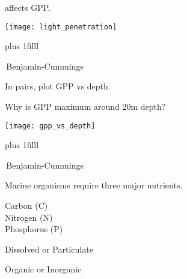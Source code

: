\documentclass[t]{beamer}
\begin{document}
\begin{frame}[t]{ affects GPP.}
\vspace*{-\baselineskip}
\begin{center}
	\texttt{[image: light\_penetration]}
\end{center}

\vskip0pt plus 1filll

\tiny\textcopyright\,Benjamin-Cummings
\end{frame}



\begin{frame}[t]{In pairs, plot GPP vs depth.}
\end{frame}

\begin{frame}[t]{Why is GPP maximum around 20m depth?}
	\vspace*{-\baselineskip}
	\begin{center}
		\texttt{[image: gpp\_vs\_depth]}
	\end{center}

	\vskip0pt plus 1filll

	\tiny\textcopyright\,Benjamin-Cummings
\end{frame}


\begin{frame}[t]{Marine organisms require three major nutrients.}

	\begin{multicols}{2}

		\begin{center}
			
			\vspace*{4\baselineskip}
			
		\end{center}
				
	\columnbreak
	
		\hangpara Carbon (C)\\ Nitrogen (N)\\ Phosphorus (P)
		
		\hangpara Dissolved or Particulate
		
		\hangpara Organic or Inorganic
		
	\end{multicols}
\end{frame}
\end{document}
